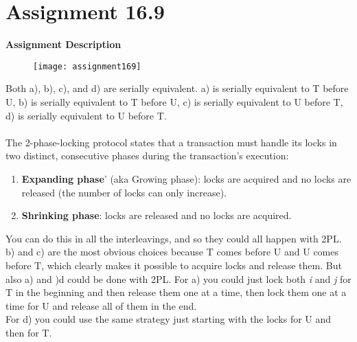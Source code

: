 \section{Assignment 16.9}
\textbf{Assignment Description}
\begin{figure}[H]
	\texttt{[image: assignment169]}
\end{figure}
Both a), b), c), and d) are serially equivalent. a) is serially equivalent to T before U, b) is serially equivalent to T before U, c) is serially equivalent to U before T, d) is serially equivalent to U before T.\\\\
The 2-phase-locking protocol states that a transaction must handle its locks in two distinct, consecutive phases during the transaction's execution:
\begin{enumerate}
	\item \textbf{Expanding phase}' (aka Growing phase): locks are acquired and no locks are released (the number of locks can only increase).
	\item \textbf{Shrinking phase}: locks are released and no locks are acquired.
\end{enumerate}
You can do this in all the interleavings, and so they could all happen with 2PL. b) and c) are the most obvious choices because T comes before U and U comes before T, which clearly makes it possible to acquire locks and release them. But also a) and )d could be done with 2PL. For a) you could just lock both \textit{i} and \textit{j} for T in the beginning and then release them one at a time, then lock them one at a time for U and release all of them in the end.\\
For d) you could use the same strategy just starting with the locks for U and then for T.